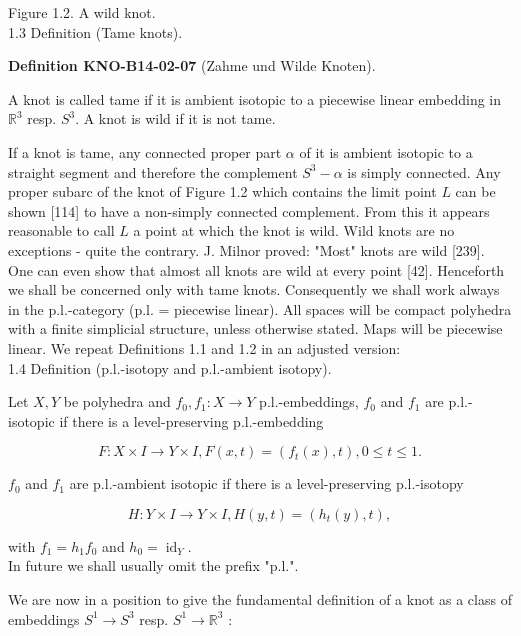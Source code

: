 \documentclass[10pt, letterpaper]{article}
\newcommand{\CustomHeading}[3]{%
  \par\medskip\noindent%
  \textbf{#1 #2} \textnormal{(#3)}.\enskip%
}
\newenvironment{DEF}[2]{\begin{unitbox}\CustomHeading{Definition}{#1}{#2}}{\end{unitbox}}
\begin{document}
Figure 1.2. A wild knot.\\

1.3 Definition (Tame knots). 

\begin{DEF}{KNO-B14-02-07}{Zahme und Wilde Knoten}
A knot is called tame if it is ambient isotopic to a piecewise linear embedding in $\mathbb{R}^{3}$ resp. $S^{3}$. A knot is wild if it is not tame.
\end{DEF}

If a knot is tame, any connected proper part $\alpha$ of it is ambient isotopic to a straight segment and therefore the complement $S^{3}-\alpha$ is simply connected. Any proper subarc of the knot of Figure 1.2 which contains the limit point $L$ can be shown [114] to have a non-simply connected complement. From this it appears reasonable to call $L$ a point at which the knot is wild. Wild knots are no exceptions - quite the contrary. J. Milnor proved: "Most" knots are wild [239]. One can even show that almost all knots are wild at every point [42]. Henceforth we shall be concerned only with tame knots. Consequently we shall work always in the p.l.-category (p.l. = piecewise linear). All spaces will be compact polyhedra with a finite simplicial structure, unless otherwise stated. Maps will be piecewise linear. We repeat Definitions 1.1 and 1.2 in an adjusted version:\\


1.4 Definition (p.l.-isotopy and p.l.-ambient isotopy). 

Let $X, Y$ be polyhedra and $f_{0}, f_{1}: X \rightarrow Y$ p.l.-embeddings, $f_{0}$ and $f_{1}$ are p.l.-isotopic if there is a level-preserving p.l.-embedding

$$
F: X \times I \rightarrow Y \times I, F(x, t)=\left(f_{t}(x), t\right), 0 \leq t \leq 1 .
$$

$f_{0}$ and $f_{1}$ are p.l.-ambient isotopic if there is a level-preserving p.l.-isotopy

$$
H: Y \times I \rightarrow Y \times I, H(y, t)=\left(h_{t}(y), t\right),
$$

with $f_{1}=h_{1} f_{0}$ and $h_{0}=\operatorname{id}_{Y}$.\\

In future we shall usually omit the prefix "p.l.".

We are now in a position to give the fundamental definition of a knot as a class of embeddings $S^{1} \rightarrow S^{3}$ resp. $S^{1} \rightarrow \mathbb{R}^{3}$ :\\
\end{document}
